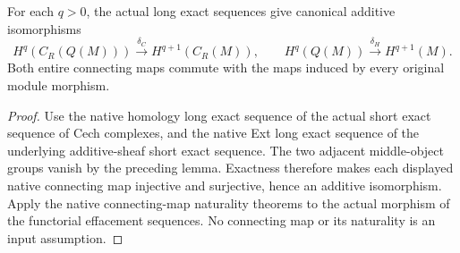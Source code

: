 \begin{lemma}
\label{lem:scheme-module-cech-native-connectings}
\leanok
{}
For each $q>0$, the actual long exact sequences give canonical additive
isomorphisms
\[
 H^q(C_R(Q(M)))\xrightarrow{\delta_C}H^{q+1}(C_R(M)),\qquad
 H^q(Q(M))\xrightarrow{\delta_H}H^{q+1}(M).
\]
Both entire connecting maps commute with the maps induced by every
original module morphism.
\end{lemma}
\begin{proof}
Use the native homology long exact sequence of the actual short exact
sequence of Cech complexes, and the native Ext long exact sequence of
the underlying additive-sheaf short exact sequence. The two adjacent
middle-object groups vanish by the preceding lemma. Exactness
therefore makes each displayed native connecting map injective and
surjective, hence an additive isomorphism. Apply the native
connecting-map naturality theorems to the actual morphism of the
functorial effacement sequences. No connecting map or its naturality
is an input assumption.
\end{proof}

